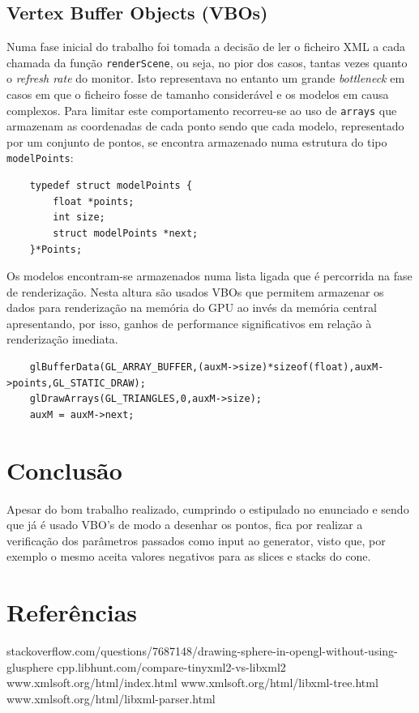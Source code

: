\documentclass{article}
\begin{document}
\subsection{Vertex Buffer Objects (VBOs)}
Numa fase inicial do trabalho foi tomada a decisão de ler o ficheiro XML a cada chamada da função \texttt{renderScene}, ou seja, no pior dos casos, tantas vezes quanto o \textit{refresh rate} do monitor. Isto representava no entanto um grande \textit{bottleneck} em casos em que o ficheiro fosse de tamanho considerável e os modelos em causa complexos. Para limitar este comportamento recorreu-se ao uso de \texttt{arrays} que armazenam as coordenadas de cada ponto sendo que cada modelo, representado por um conjunto de pontos, se encontra armazenado numa estrutura do tipo \texttt{modelPoints}:
\begin{Verbatim}
    typedef struct modelPoints {
        float *points;
        int size;
        struct modelPoints *next;
    }*Points;
\end{Verbatim}
Os modelos encontram-se armazenados numa lista ligada que é percorrida na fase de renderização. Nesta altura são usados VBOs que permitem armazenar os dados para renderização na memória do GPU ao invés da memória central apresentando, por isso, ganhos de performance significativos em relação à renderização imediata.

\begin{Verbatim}
    glBufferData(GL_ARRAY_BUFFER,(auxM->size)*sizeof(float),auxM->points,GL_STATIC_DRAW);
    glDrawArrays(GL_TRIANGLES,0,auxM->size);
    auxM = auxM->next;
\end{Verbatim}

\newpage

\section{Conclusão}
Apesar do bom trabalho realizado, cumprindo o estipulado no enunciado e sendo que já é usado VBO's de modo a desenhar os pontos, fica por realizar a verificação dos parâmetros passados como input ao generator, visto que, por exemplo o mesmo aceita valores negativos para as slices e stacks do cone.

\newpage

\section{Referências}
stackoverflow.com/questions/7687148/drawing-sphere-in-opengl-without-using-glusphere
\newline
cpp.libhunt.com/compare-tinyxml2-vs-libxml2
\newline
www.xmlsoft.org/html/index.html
\newline
www.xmlsoft.org/html/libxml-tree.html
\newline
www.xmlsoft.org/html/libxml-parser.html
\end{document}
